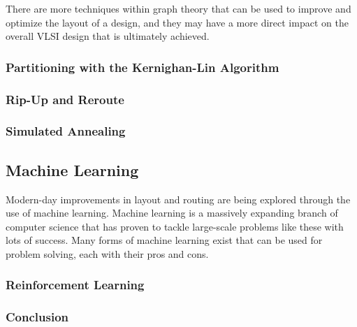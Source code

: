 \documentclass[12pt]{article}
\begin{document}
\begin{flushleft}
There are more techniques within graph theory that can
be used to improve and optimize the layout of a design,
and they may have a more direct impact on the overall
VLSI design that is ultimately achieved. 

\subsubsection*{Partitioning with the Kernighan-Lin Algorithm}


\subsubsection*{Rip-Up and Reroute}


\subsubsection*{Simulated Annealing}


\subsection*{Machine Learning}

Modern-day improvements in layout and routing are being
explored through the use of machine learning. Machine
learning is a massively expanding branch of computer science
that has proven to tackle large-scale problems like these
with lots of success. Many forms of machine learning
exist that can be used for problem solving, each with their
pros and cons.

\subsubsection*{Reinforcement Learning}


\subsubsection*{Conclusion}



\newpage

\printbibliography

\end{flushleft}
\end{document}
